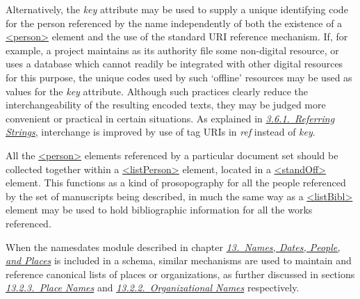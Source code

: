 Alternatively, the {\itshape key} attribute may be used to supply a unique identifying code for the person referenced by the name independently of both the existence of a \hyperref[TEI.person]{<person>} element and the use of the standard URI reference mechanism. If, for example, a project maintains as its authority file some non-digital resource, or uses a database which cannot readily be integrated with other digital resources for this purpose, the unique codes used by such ‘offline’ resources may be used as values for the {\itshape key} attribute. Although such practices clearly reduce the interchangeability of the resulting encoded texts, they may be judged more convenient or practical in certain situations. As explained in \textit{\hyperref[CONARS]{3.6.1.\ Referring Strings}}, interchange is improved by use of tag URIs in {\itshape ref} instead of {\itshape key}.\par
All the \hyperref[TEI.person]{<person>} elements referenced by a particular document set should be collected together within a \hyperref[TEI.listPerson]{<listPerson>}  element, located in a \hyperref[TEI.standOff]{<standOff>} element. This functions as a kind of prosopography for all the people referenced by the set of manuscripts being described, in much the same way as a \hyperref[TEI.listBibl]{<listBibl>} element may be used to hold bibliographic information for all the works referenced.\par
When the \textsf{namesdates} module described in chapter \textit{\hyperref[ND]{13.\ Names, Dates, People, and Places}} is included in a schema, similar mechanisms are used to maintain and reference canonical lists of places or organizations, as further discussed in sections \textit{\hyperref[NDPLAC]{13.2.3.\ Place Names}} and \textit{\hyperref[NDORG]{13.2.2.\ Organizational Names}} respectively.
